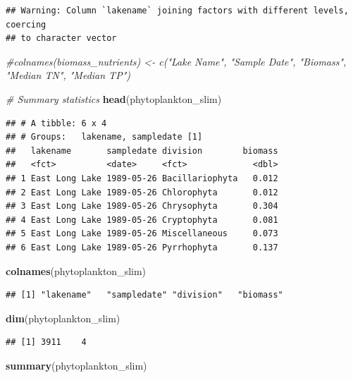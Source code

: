 \documentclass[12pt,]{article}
\newenvironment{Shaded}{\begin{snugshade}}{\end{snugshade}}
\newcommand{\KeywordTok}[1]{\textcolor[rgb]{0.13,0.29,0.53}{\textbf{#1}}}
\newcommand{\CommentTok}[1]{\textcolor[rgb]{0.56,0.35,0.01}{\textit{#1}}}
\newcommand{\NormalTok}[1]{#1}
\begin{document}
\begin{verbatim}
## Warning: Column `lakename` joining factors with different levels, coercing
## to character vector
\end{verbatim}

\begin{Shaded}
\begin{Highlighting}[]
\CommentTok{#colnames(biomass_nutrients) <- c("Lake Name", "Sample Date", "Biomass", "Median TN", "Median TP")}

\CommentTok{# Summary statistics}
\KeywordTok{head}\NormalTok{(phytoplankton_slim)}
\end{Highlighting}
\end{Shaded}

\begin{verbatim}
## # A tibble: 6 x 4
## # Groups:   lakename, sampledate [1]
##   lakename       sampledate division        biomass
##   <fct>          <date>     <fct>             <dbl>
## 1 East Long Lake 1989-05-26 Bacillariophyta   0.012
## 2 East Long Lake 1989-05-26 Chlorophyta       0.012
## 3 East Long Lake 1989-05-26 Chrysophyta       0.304
## 4 East Long Lake 1989-05-26 Cryptophyta       0.081
## 5 East Long Lake 1989-05-26 Miscellaneous     0.073
## 6 East Long Lake 1989-05-26 Pyrrhophyta       0.137
\end{verbatim}

\begin{Shaded}
\begin{Highlighting}[]
\KeywordTok{colnames}\NormalTok{(phytoplankton_slim)}
\end{Highlighting}
\end{Shaded}

\begin{verbatim}
## [1] "lakename"   "sampledate" "division"   "biomass"
\end{verbatim}

\begin{Shaded}
\begin{Highlighting}[]
\KeywordTok{dim}\NormalTok{(phytoplankton_slim)}
\end{Highlighting}
\end{Shaded}

\begin{verbatim}
## [1] 3911    4
\end{verbatim}

\begin{Shaded}
\begin{Highlighting}[]
\KeywordTok{summary}\NormalTok{(phytoplankton_slim)}
\end{Highlighting}
\end{Shaded}
\end{document}
